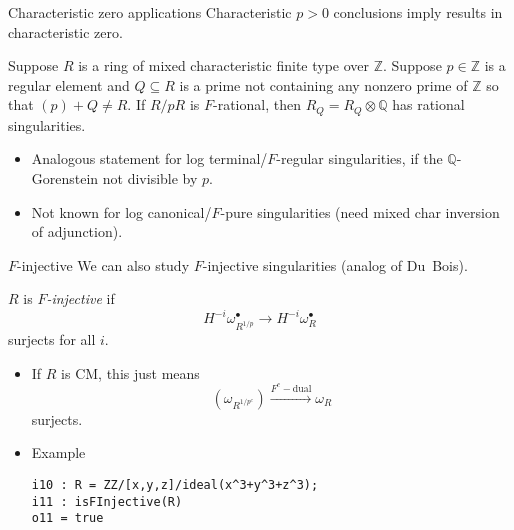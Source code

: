 \documentclass[xcolor=dvipsnames]{beamer}
\newcommand{\memph}[1]{{\color{Red}\emph{#1}}}
\newcommand{\bQ}{\mathbb{Q}}
\newcommand{\bZ}{\mathbb{Z}}
\newcommand{\mydot}{\bullet}
\theoremstyle{remark}
\begin{document}
\begin{frame}[c]{Characteristic zero applications}
    Characteristic $p > 0$ conclusions imply results in characteristic zero.
    \begin{theorem}[Ma-{$\bullet$}]
        Suppose $R$ is a ring of mixed characteristic finite type over $\bZ$.  Suppose $p \in \bZ$ is a regular element and $Q \subseteq R$ is a prime not containing any nonzero prime of $\bZ$ so that $(p) + Q \neq R$.
        \vskip 9pt
        If $R/pR$ is $F$-rational, then $R_Q = R_Q \otimes \bQ$ has rational singularities.
    \end{theorem}
    \begin{itemize}
    \item<2->Analogous statement for log terminal/$F$-regular singularities, if the $\bQ$-Gorenstein not divisible by $p$.
    \item<3->Not known for log canonical/$F$-pure singularities (need mixed char inversion of adjunction).
    \end{itemize}
\end{frame}

\begin{frame}[fragile]{$F$-injective}
    We can also study $F$-injective singularities (analog of Du~Bois).
    
        \begin{definition}
        $R$ is \memph{$F$-injective} if
        \[
        H^{-i} \omega_{R^{1/p}}^{\mydot} \to H^{-i} \omega_{R}^{\mydot}
        \]
        surjects for all $i$.
        \end{definition}
        \begin{itemize}
        \item<2->  If $R$ is CM, this just means
        \[
            (\omega_{R^{1/p^e}}) \xrightarrow{F^e-\mathrm{dual}} \omega_R
        \]
        surjects.
        \item<3->  Example
        \begin{verbatim}
i10 : R = ZZ/[x,y,z]/ideal(x^3+y^3+z^3);
i11 : isFInjective(R)
o11 = true
        \end{verbatim}
    \end{itemize}
\end{frame}
\end{document}

